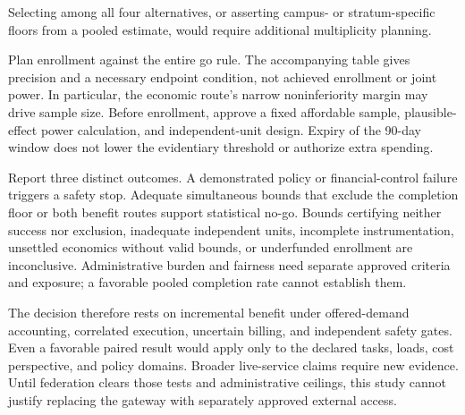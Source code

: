 \documentclass[11pt]{article}
\begin{document}
Selecting among all four alternatives, or asserting campus- or stratum-specific floors from a pooled estimate, would require additional multiplicity planning.

Plan enrollment against the entire go rule. The accompanying table gives precision and a necessary endpoint condition, not achieved enrollment or joint power. In particular, the economic route's narrow noninferiority margin may drive sample size. Before enrollment, approve a fixed affordable sample, plausible-effect power calculation, and independent-unit design. Expiry of the 90-day window does not lower the evidentiary threshold or authorize extra spending.

Report three distinct outcomes. A demonstrated policy or financial-control failure triggers a safety stop. Adequate simultaneous bounds that exclude the completion floor or both benefit routes support statistical no-go. Bounds certifying neither success nor exclusion, inadequate independent units, incomplete instrumentation, unsettled economics without valid bounds, or underfunded enrollment are inconclusive. Administrative burden and fairness need separate approved criteria and exposure; a favorable pooled completion rate cannot establish them.

The decision therefore rests on incremental benefit under offered-demand accounting, correlated execution, uncertain billing, and independent safety gates. Even a favorable paired result would apply only to the declared tasks, loads, cost perspective, and policy domains. Broader live-service claims require new evidence. Until federation clears those tests and administrative ceilings, this study cannot justify replacing the gateway with separately approved external access.
\end{document}
